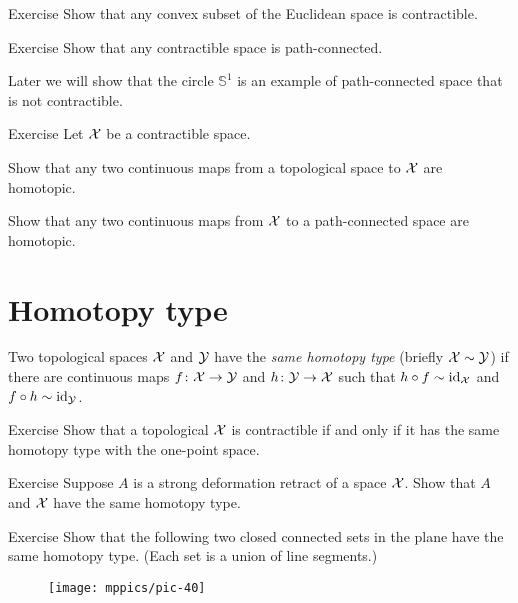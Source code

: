 \begin{thm}{Exercise}
Show that any convex subset of the Euclidean space is contractible.
\end{thm}


\begin{thm}{Exercise}
Show that any contractible space is path-connected.
\end{thm}

Later we will show that the circle $\mathbb{S}^1$ is an example of path-connected space that is not contractible.

\begin{thm}{Exercise}
Let $\mathcal{X}$ be a contractible space.

\begin{subthm}{}
Show that any two continuous maps from a topological space to $\mathcal{X}$ are homotopic.
\end{subthm}

\begin{subthm}{}
Show that any two continuous maps from $\mathcal{X}$ to a path-connected space are homotopic.
\end{subthm}

\end{thm}

\section{Homotopy type}

Two topological spaces $\mathcal{X}$ and $\mathcal{Y}$ have the \emph{same homotopy type} (briefly $\mathcal{X}\sim\mathcal{Y}$) if there are continuous maps
$f\colon \mathcal{X}\to \mathcal{Y}$ and $h\colon\mathcal{Y}\to \mathcal{X}$ such that $h\circ f\sim \mathrm{id}_\mathcal{X}$ and $f\circ h\sim \mathrm{id}_\mathcal{Y}$.

\begin{thm}{Exercise}
Show that a topological $\mathcal{X}$ is contractible if and only if it has the same homotopy type with the one-point space.
\end{thm}

\begin{thm}{Exercise}
Suppose $A$ is a strong deformation retract of a space $\mathcal{X}$.
Show that $A$ and $\mathcal{X}$ have the same homotopy type.
\end{thm}


\begin{thm}{Exercise}
Show that the following two closed connected sets in the plane have the same homotopy type.
(Each set is a union of line segments.)

\begin{figure}[!ht]
\centering
\texttt{[image: mppics/pic-40]}
\end{figure}
\end{thm}



